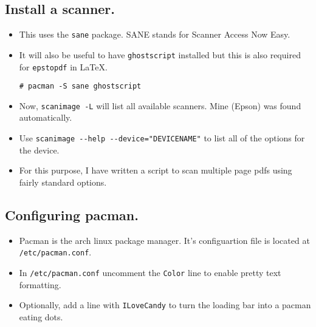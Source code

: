 \documentclass{article}
\begin{document}
  \subsection{Install a scanner.}
    \begin{itemize}
      \item This uses the \verb|sane| package. SANE stands for Scanner Access
        Now Easy.
      \item It will also be useful to have \verb|ghostscript| installed but
        this is also required for \verb|epstopdf| in \LaTeX.
\begin{verbatim}
# pacman -S sane ghostscript
\end{verbatim}
      \item Now, \verb|scanimage -L| will list all available scanners. Mine
        (Epson) was found automatically.
      \item Use \verb|scanimage --help --device="DEVICENAME"| to list
        all of the options for the device.
      \item For this purpose, I have written a script to scan multiple page pdfs
        using fairly standard options.
    \end{itemize}

  \subsection{Configuring pacman.}
    \begin{itemize}
      \item Pacman is the arch linux package manager. It's configuartion file is
        located at \verb|/etc/pacman.conf|.
      \item In \verb|/etc/pacman.conf| uncomment the \verb|Color| line to
        enable pretty text formatting.
      \item Optionally, add a line with \verb|ILoveCandy| to turn the loading
        bar into a pacman eating dots.
    \end{itemize}
\end{document}
